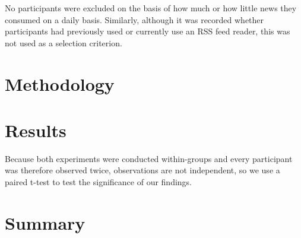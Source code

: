 No participants were excluded on the basis of how much or how little news they consumed on a daily basis. Similarly, although it was recorded whether participants had previously used or currently use an RSS feed reader, this was not used as a selection criterion. 


\section{Methodology}

\section{Results}

Because both experiments were conducted within-groups and every participant was therefore observed twice, observations are not independent, so we use a paired t-test to test the significance of our findings.

\section{Summary}